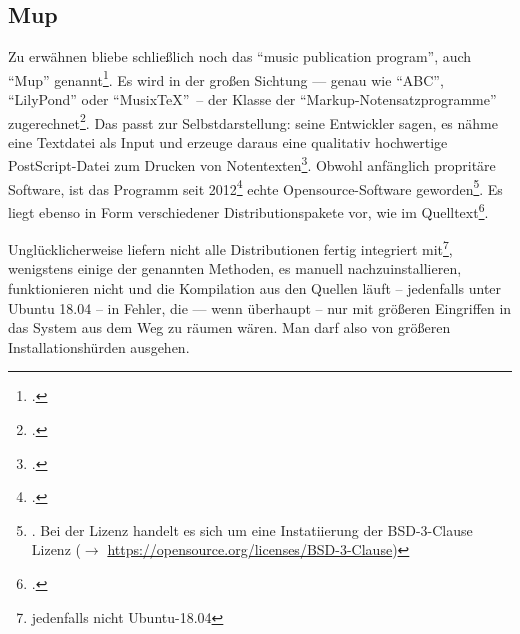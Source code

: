 %
%
%



\subsection{Mup}

Zu erwähnen bliebe schließlich noch das \enquote{music publication program},
auch \enquote{Mup} genannt\footcite[vgl.][\nopage wp]{Arkka2017a}. Es wird in
der großen Sichtung --- genau wie \enquote{ABC}, \enquote{LilyPond} oder
\enquote{Musix\TeX}\ -- der Klasse der \enquote{Markup-Notensatzprogramme}
zugerechnet\footcite[vgl.][\nopage wp]{WpedNotensatz2019a}. Das passt zur
Selbstdarstellung: seine Entwickler sagen, es nähme eine Textdatei als Input
und erzeuge daraus eine qualitativ hochwertige PostScript-Datei zum Drucken von
Notentexten\footcite[vgl.][\nopage wp]{Arkka2017a}. Obwohl anfänglich propritäre
Software, ist das Programm seit 2012\footcite[vgl.][\nopage wp]{Arkka2017a}
echte Opensource-Software geworden\footnote{\cite[vgl.][\nopage wp]{Arkka2017b}.
Bei der Lizenz handelt es sich um eine Instatiierung der BSD-3-Clause Lizenz
($\rightarrow$ \href{https://opensource.org/licenses/BSD-3-Clause}
{https://opensource.org/licenses/BSD-3-Clause})}. Es liegt ebenso in Form
verschiedener Distributionspakete vor, wie im Quelltext\footcite[vgl.][\nopage
wp]{Arkka2017c}.

Unglücklicherweise liefern nicht alle Distributionen  fertig integriert
mit\footnote{jedenfalls nicht Ubuntu-18.04}, wenigstens einige der genannten
Methoden, es manuell nachzuinstallieren, funktionieren nicht und die Kompilation aus den
Quellen läuft -- jedenfalls unter Ubuntu 18.04 -- in Fehler, die --- wenn
überhaupt -- nur mit größeren Eingriffen in das System aus dem Weg zu räumen
wären. Man darf also von größeren Installationshürden ausgehen.


